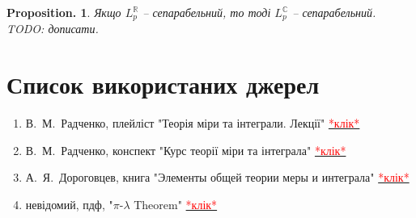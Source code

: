 \documentclass[a4paper, 10pt]{article}
\theoremstyle{theoremdd}
\newtheorem*{proposition*}{Proposition.}
\begin{document}
\begin{proposition*}
Якщо $L_p^{\mathbb{R}}$ -- сепарабельний, то тоді $L_p^{\mathbb{C}}$ -- сепарабельний.\\
\textit{TODO: дописати.}
\end{proposition*}


\newpage
\thispagestyle{empty}
\section*{Список використаних джерел}
\begin{enumerate}[wide=0pt]
\item В.\ М.\ Радченко, плейліст "Теорія міри та інтеграли. Лекції" \quad \href{https://www.youtube.com/@vadymradchenko8925/playlists}{\textcolor{red}{*клік*}}
\item В.\ М.\ Радченко, конспект "Курс теорії міри та інтеграла" \qquad \href{https://mechmat.knu.ua/wp-content/uploads/2018/08/measuretheoryradchenko_a4_2018.pdf}{\textcolor{red}{*клік*}}
\item А.\ Я.\ Дороговцев, книга "Элементы общей теории меры и интеграла" \quad \href{https://www.slideshare.net/YuriyMaturin/ss-58815473}{\textcolor{red}{*клік*}}
\item невідомий, пдф, "$\pi$-$\lambda$ Theorem" \quad \href{https://www2.stat.duke.edu/~sayan/CBB2012/1-2-pilambdamonotone.pdf}{\textcolor{red}{*клік*}}
\end{enumerate}
\end{document}
